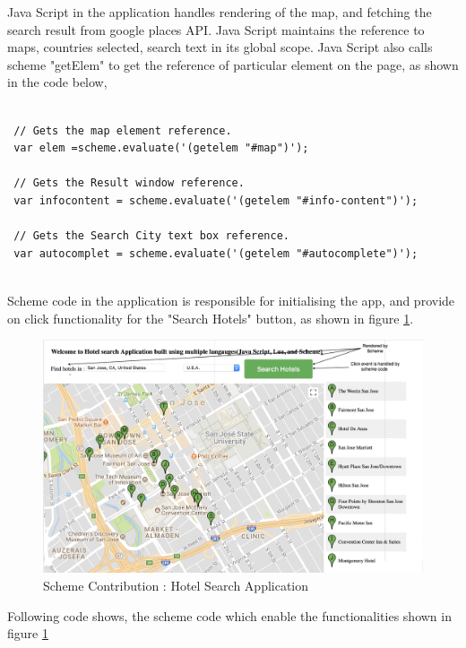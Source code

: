 Java Script in the application handles  rendering of the map, and fetching the search result from google places API. Java Script maintains the reference to maps, countries selected, search text in its global scope. Java Script also calls scheme "getElem" to get the reference of particular element on the page, as shown in the code below, 

 \begin{lstlisting}[frame=single, style=base]
 
 // Gets the map element reference.
 var elem =scheme.evaluate('(getelem "#map")');
 
 // Gets the Result window reference.
 var infocontent = scheme.evaluate('(getelem "#info-content")');
 
 // Gets the Search City text box reference.
 var autocomplet = scheme.evaluate('(getelem "#autocomplete")');
 
 \end{lstlisting} 

Scheme code in the application is responsible for initialising the app, and provide on click functionality for the "Search Hotels" button, as shown in figure \ref{fig:schemeINteraction}.

\begin{figure}[H]
	\begin{center}
		\includegraphics[width=\linewidth]{./images/schemeINteraction.png}
	\end{center}
	\caption{Scheme Contribution : Hotel Search Application}
	\label{fig:schemeINteraction}
\end{figure}

Following code shows, the scheme code which enable the functionalities shown in figure \ref{fig:schemeINteraction}

